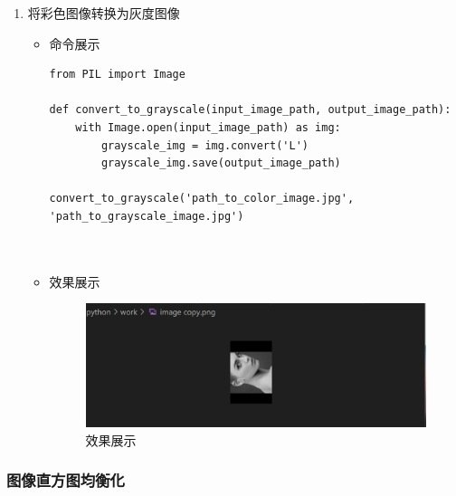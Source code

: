 \documentclass[UTF8]{ctexart}
\begin{document}
\begin{enumerate}
  \item 将彩色图像转换为灰度图像
  \begin{itemize}
  \item 命令展示
  \begin{verbatim}
from PIL import Image

def convert_to_grayscale(input_image_path, output_image_path):
    with Image.open(input_image_path) as img:
        grayscale_img = img.convert('L')
        grayscale_img.save(output_image_path)

convert_to_grayscale('path_to_color_image.jpg', 'path_to_grayscale_image.jpg')

    
  \end{verbatim}

 
\item 效果展示
  \begin{figure}[H]
    \centering
    \includegraphics[width=\textwidth]{334} %
    \caption{效果展示}
  \end{figure}
  \end{itemize}
\end{enumerate}

















\subsubsection{图像直方图均衡化}
\end{document}
